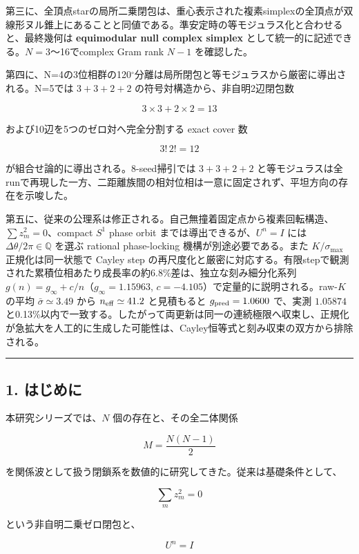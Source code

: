 \documentclass[
  a4paper,
]{ltjsarticle}
\begin{document}
第三に、全頂点starの局所二乗閉包は、重心表示された複素simplexの全頂点が双線形ヌル錐上にあることと同値である。準安定時の等モジュラス化と合わせると、最終幾何は
\textbf{equimodular null complex simplex}
として統一的に記述できる。\(N=3\)〜16でcomplex Gram rank \(N-1\)
を確認した。

第四に、N=4の3位相群の120\(^\circ\)分離は局所閉包と等モジュラスから厳密に導出される。N=5では
\(3+3+2+2\) の符号対構造から、非自明2辺閉包数

\[
3\times3+2\times2=13
\]

および10辺を5つのゼロ対へ完全分割する exact cover 数

\[
3!\,2!=12
\]

が組合せ論的に導出される。8-seed掃引では \(3+3+2+2\)
と等モジュラスは全runで再現した一方、二距離族間の相対位相は一意に固定されず、平坦方向の存在を示唆した。

第五に、従来の公理系は修正される。自己無撞着固定点から複素回転構造、\(\sum z_m^2=0\)、compact
\(S^1\) phase orbit までは導出できるが、\(U^n=I\) には
\(\Delta\theta/2\pi\in\mathbb Q\) を選ぶ rational phase-locking
機構が別途必要である。また \(K/\sigma_{\max}\) 正規化は同一状態で Cayley
step
の再尺度化と厳密に対応する。有限stepで観測された累積位相あたり成長率の約6.8\%差は、独立な刻み細分化系列
\(g(n)=g_\infty+c/n\)（\(g_\infty=1.15963\),
\(c=-4.105\)）で定量的に説明される。raw-\(K\) の平均
\(\bar\sigma\simeq3.49\) から \(n_{\rm eff}\simeq41.2\) と見積もると
\(g_{\rm pred}=1.0600\) で、実測 \(1.05874\)
と0.13\%以内で一致する。したがって両更新は同一の連続極限へ収束し、正規化が急拡大を人工的に生成した可能性は、Cayley恒等式と刻み収束の双方から排除される。

\begin{center}\rule{0.5\linewidth}{0.5pt}\end{center}

\subsection{1. はじめに}\label{ux306fux3058ux3081ux306b}

本研究シリーズでは、\(N\) 個の存在と、その全二体関係

\[
M=\frac{N(N-1)}2
\]

を関係波として扱う閉鎖系を数値的に研究してきた。従来は基礎条件として、

\[
\sum_m z_m^2=0
\]

という非自明二乗ゼロ閉包と、

\[
U^n=I
\]
\end{document}
